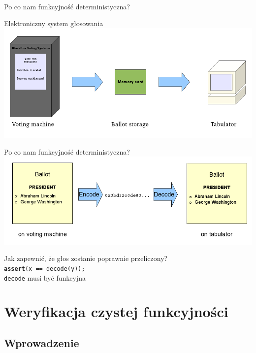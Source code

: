 \documentclass[handout]{beamer}
\begin{document}
\begin{frame}{Po co nam funkcyjność deterministyczna?}
  \begin{center}
    Elektroniczny system głosowania
  \includegraphics[width=\columnwidth]{img/voting-1.png}
  \end{center}
\end{frame}

\begin{frame}{Po co nam funkcyjność deterministyczna?}
  \includegraphics[width=\columnwidth]{img/voting-2.png}
  \begin{center}
  \pause
  Jak zapewnić, że głos zostanie poprawnie przeliczony? \\
  \pause
  \texttt{\textbf{assert}(x == decode(y));} \\
  \pause
  \alert{\texttt{decode} musi być funkcyjna}
  \end{center}
\end{frame}

\section{Weryfikacja czystej funkcyjności}

\subsection{Wprowadzenie}
\end{document}
